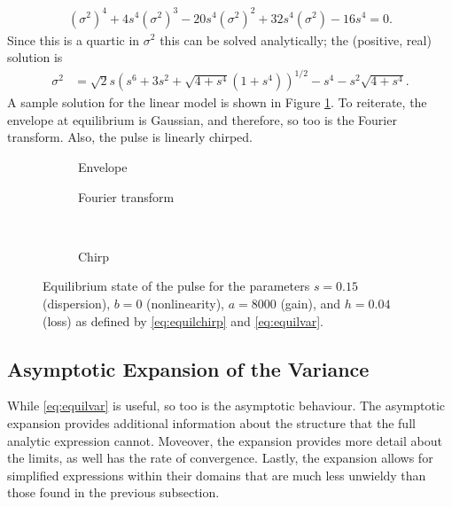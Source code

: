 \begin{align}
\label{eq:var}
\left( \sigma^2 \right)^4 + 4 s^4 \left( \sigma^2 \right)^3 - 20 s^4 \left( \sigma^2 \right)^2 + 32 s^4 \left( \sigma^2 \right) - 16 s^4 = 0.
\end{align}
Since this is a quartic in $\sigma^2$ this can be solved analytically; the (positive, real) solution is
\begin{align}
\label{eq:equilvar}
\sigma^2 &= \sqrt{2} s \left( s^6 + 3s^2 + \sqrt{4 + s^4} \left( 1 + s^4 \right) \right)^{1/2} - s^4 - s^2 \sqrt{4 + s^4}.
\end{align}
A sample solution for the linear model is shown in Figure \ref{fig:linear}. To reiterate, the envelope at equilibrium is Gaussian, and therefore, so too is the Fourier transform. Also, the pulse is linearly chirped. \\

\begin{figure}[tbp]
\centering
\begin{subfigure}{0.5\textwidth}
\centering

\caption{Envelope}
\end{subfigure}%
\begin{subfigure}{0.5\textwidth}
\centering

\caption{Fourier transform}
\end{subfigure} \\
\begin{subfigure}{0.5\textwidth}
\centering

\caption{Chirp}
\end{subfigure}
\caption[Envelope, Fourier transform, and chirp of the pulse---linear case.]{Equilibrium state of the pulse for the parameters $s = 0.15$ (dispersion), $b = 0$ (nonlinearity), $a = 8000$ (gain), and $h = 0.04$ (loss) as defined by \eqref{eq:equilchirp} and \eqref{eq:equilvar}.}
\label{fig:linear}
\end{figure}

\subsection{Asymptotic Expansion of the Variance}
While \eqref{eq:equilvar} is useful, so too is the asymptotic behaviour. The asymptotic expansion provides additional information about the structure that the full analytic expression cannot. Moveover, the expansion provides more detail about the limits, as well has the rate of convergence. Lastly, the expansion allows for simplified expressions within their domains that are much less unwieldy than those found in the previous subsection. \\


